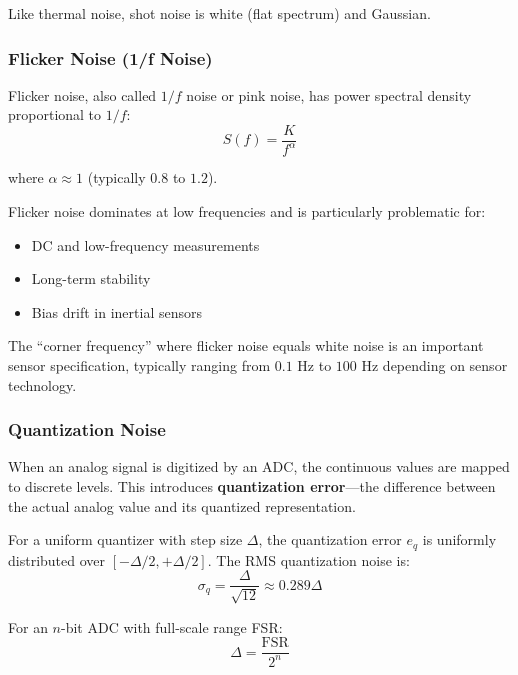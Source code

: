 Like thermal noise, shot noise is white (flat spectrum) and Gaussian.

\subsubsection{Flicker Noise (1/f Noise)}

Flicker noise, also called $1/f$ noise or pink noise, has power spectral density proportional to $1/f$:
\begin{equation}
S(f) = \frac{K}{f^{\alpha}}
\label{eq:flicker_noise}
\end{equation}

where $\alpha \approx 1$ (typically $0.8$ to $1.2$).

Flicker noise dominates at low frequencies and is particularly problematic for:
\begin{itemize}
    \item DC and low-frequency measurements
    \item Long-term stability
    \item Bias drift in inertial sensors
\end{itemize}

The ``corner frequency'' where flicker noise equals white noise is an important sensor specification, typically ranging from $0.1\text{ Hz}$ to $100\text{ Hz}$ depending on sensor technology.

\subsubsection{Quantization Noise}

When an analog signal is digitized by an ADC, the continuous values are mapped to discrete levels. This introduces \textbf{quantization error}---the difference between the actual analog value and its quantized representation.

For a uniform quantizer with step size $\Delta$, the quantization error $e_q$ is uniformly distributed over $[-\Delta/2, +\Delta/2]$. The RMS quantization noise is:
\begin{equation}
\sigma_q = \frac{\Delta}{\sqrt{12}} \approx 0.289\Delta
\label{eq:quantization_noise}
\end{equation}

For an $n$-bit ADC with full-scale range FSR:
\begin{equation}
\Delta = \frac{\text{FSR}}{2^n}
\label{eq:lsb}
\end{equation}

